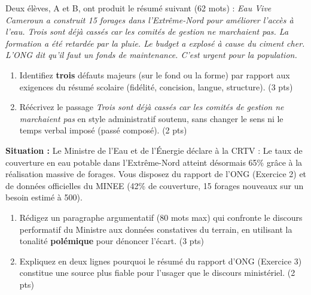 \documentclass[11pt]{article}
\begin{document}
\begin{exercice}
Deux élèves, A et B, ont produit le résumé suivant (62 mots) :
\og \textit{Eau Vive Cameroun a construit 15 forages dans l'Extrême-Nord pour améliorer l'accès à l'eau. Trois sont déjà cassés car les comités de gestion ne marchaient pas. La formation a été retardée par la pluie. Le budget a explosé à cause du ciment cher. L'ONG dit qu'il faut un fonds de maintenance. C'est urgent pour la population.} \fg

\begin{enumerate}
    \item Identifiez \textbf{trois} défauts majeurs (sur le fond ou la forme) par rapport aux exigences du résumé scolaire (fidélité, concision, langue, structure). (3 pts)
    \item Réécrivez le passage \og \textit{Trois sont déjà cassés car les comités de gestion ne marchaient pas} \fg{} en style administratif soutenu, sans changer le sens ni le temps verbal imposé (passé composé). (2 pts)
\end{enumerate}
\end{exercice}

\begin{exercice}
\textbf{Situation :} Le Ministre de l'Eau et de l'Énergie déclare à la CRTV : \og Le taux de couverture en eau potable dans l'Extrême-Nord atteint désormais 65\% grâce à la réalisation massive de forages. \fg{} Vous disposez du rapport de l'ONG (Exercice 2) et de données officielles du MINEE (42\% de couverture, 15 forages nouveaux sur un besoin estimé à 500).

\begin{enumerate}
    \item Rédigez un paragraphe argumentatif (80 mots max) qui confronte le discours performatif du Ministre aux données constatives du terrain, en utilisant la tonalité \textbf{polémique} pour dénoncer l'écart. (3 pts)
    \item Expliquez en deux lignes pourquoi le résumé du rapport d'ONG (Exercice 3) constitue une source plus fiable pour l'usager que le discours ministériel. (2 pts)
\end{enumerate}
\end{exercice}
\end{document}
